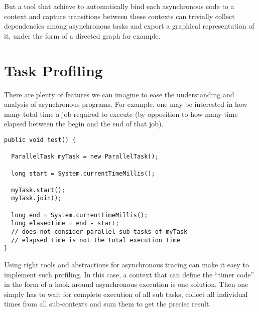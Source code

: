 But a tool that achieve to automatically bind each asynchronous code to a context and capture transitions between these contexts can trivially collect dependencies among asynchronous tasks and export a graphical representation of it, under the form of a directed graph for example.

\section{Task Profiling}

There are plenty of features we can imagine to ease the understanding and analysis of asynchronous programs. For example, one may be interested in how many total time a job required to execute (by opposition to how many time elapsed between the begin and the end of that job).

\begin{lstlisting}
public void test() {
  
  ParallelTask myTask = new ParallelTask();

  long start = System.currentTimeMillis();

  myTask.start();
  myTask.join();

  long end = System.currentTimeMillis();
  long elasedTime = end - start;
  // does not consider parallel sub-tasks of myTask
  // elapsed time is not the total execution time
}
\end{lstlisting}

Using right tools and abstractions for asynchronous tracing can make it easy to implement such profiling. In this case, a context that can define the ``timer code'' in the form of a hook around asynchronous execution is one solution. Then one simply has to wait for complete execution of all sub tasks, collect all individual times from all sub-contexts and sum them to get the precise result.

